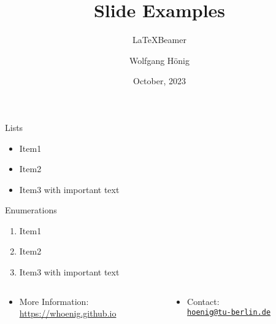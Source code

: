 \documentclass[aspectratio=169,xcolor={svgnames}]{beamer}
\title{Slide Examples}
\subtitle{\LaTeX Beamer}
\author{Wolfgang Hönig}
\date{October, 2023}
\begin{document}

  \begin{frame}{Lists}

    \begin{itemize}
      \item Item1
      \item Item2
      \item Item3 with \alert{important} text
    \end{itemize}

  \end{frame}

  \begin{frame}{Enumerations}

    \begin{enumerate}
      \item Item1
      \item Item2
      \item Item3 with \alert{important} text
    \end{enumerate}

  \end{frame}

  \appendix

  \begin{frame}[standout]
    \inserttitle

    \begin{center}
    \end{center}

    \begin{columns}
      \begin{column}{0.55\textwidth}
        \begin{itemize}
        \item More Information:\\\url{https://whoenig.github.io}
        \end{itemize}
      \end{column}
      \begin{column}{0.45\textwidth}
        \begin{itemize}
        \item Contact:\\\href{mailto:hoenig@tu-berlin.de}{\texttt{hoenig@tu-berlin.de}}%
        \end{itemize}
      \end{column}
    \end{columns}
  \end{frame}
\end{document}
